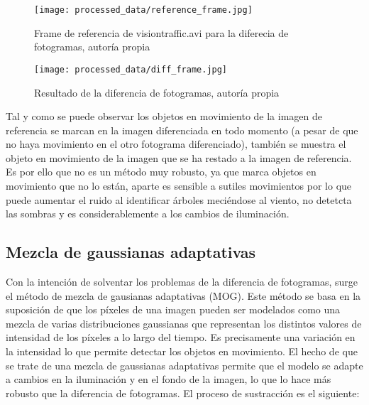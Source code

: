 \documentclass[a4paper,12pt]{article}
\begin{document}
{\vspace{0.5cm}

\begin{figure}[h!]
    \centering
    \begin{minipage}[t]{0.45\textwidth}
        \centering
        \texttt{[image: processed\_data/reference\_frame.jpg]}
        \caption{Frame de referencia de visiontraffic.avi para la diferecia de fotogramas, autoría propia}
        \label{fig:reference-frame}
    \end{minipage}
    \hfill
    \begin{minipage}[t]{0.45\textwidth}
        \centering
        \texttt{[image: processed\_data/diff\_frame.jpg]}
        \caption{Resultado de la diferencia de fotogramas, autoría propia}
        \label{fig:differenced-frame}
    \end{minipage}

\end{figure}

\vspace{0.5cm}

Tal y como se puede observar los objetos en movimiento de la imagen de referencia se marcan en la imagen diferenciada en todo momento (a pesar de que no haya movimiento en 
el otro fotograma diferenciado), también se muestra el objeto en movimiento de la imagen que se ha restado a la imagen de referencia. Es por ello que no es un método muy 
robusto, ya que marca objetos en movimiento que no lo están, aparte es sensible a sutiles movimientos por lo que puede aumentar el ruido al identificar árboles meciéndose
al viento, no detetcta las sombras y es considerablemente a los cambios de iluminación.

\vspace{0.5cm}

\subsection{Mezcla de gaussianas adaptativas}

\vspace{0.5cm}

Con la intención de solventar los problemas de la diferencia de fotogramas, surge el método de mezcla de gausianas adaptativas (MOG). Este
método se basa en la suposición de que los píxeles de una imagen pueden ser modelados como una mezcla de varias distribuciones gaussianas que 
representan los distintos valores de intensidad de los píxeles a lo largo del tiempo. Es precisamente una variación en la intensidad lo que 
permite detectar los objetos en movimiento. El hecho de que se trate de una mezcla de gaussianas adaptativas permite que el modelo se adapte a
cambios en la iluminación y en el fondo de la imagen, lo que lo hace más robusto que la diferencia de fotogramas. El proceso de sustracción es el siguiente:

}
\end{document}
